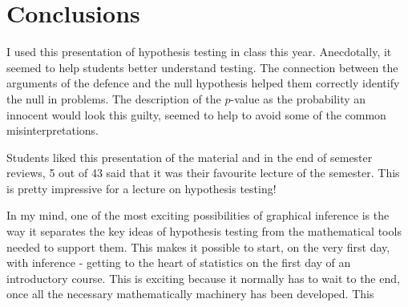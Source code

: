 \documentclass[oneside]{article}
\begin{document}
\section{Conclusions}

I used this presentation of hypothesis testing in class this year. Anecdotally, it seemed to help students better understand testing. The connection between the arguments of the defence and the null hypothesis helped them correctly identify the null in problems. The description of the $p$-value as the probability an innocent would look this guilty, seemed to help to avoid some of the common misinterpretations.

Students liked this presentation of the material and in the end of semester reviews, 5 out of 43 said that it was their favourite lecture of the semester. This is pretty impressive for a lecture on hypothesis testing!

In my mind, one of the most exciting possibilities of graphical inference is the way it separates the key ideas of hypothesis testing from the mathematical tools needed to support them. This makes it possible to start, on the very first day, with inference - getting to the heart of statistics on the first day of an introductory course. This is exciting because it normally has to wait to the end, once all the necessary mathematically machinery has been developed.  This 


\end{document}
